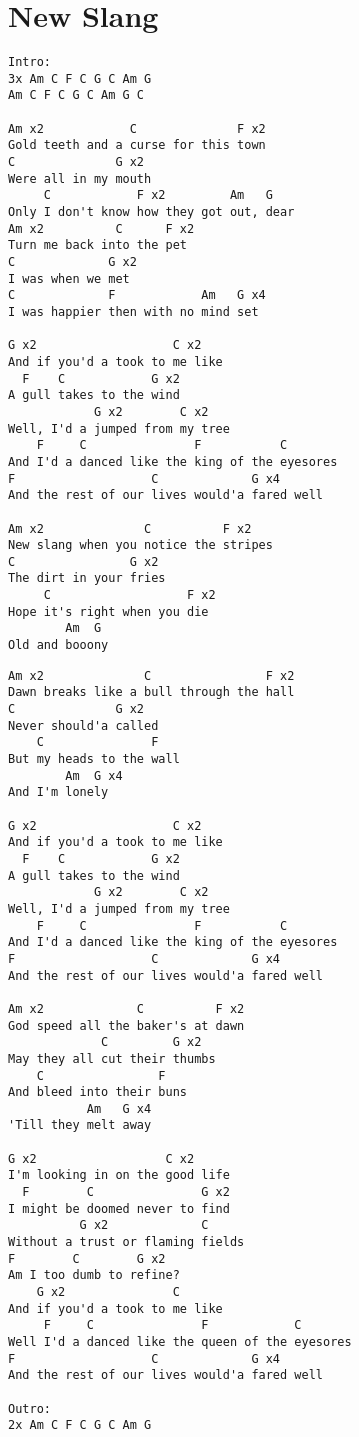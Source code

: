 \documentclass[leqno]{memoir}
\begin{document}
\chapter{New Slang}
\begin{verbatim}
Intro:
3x Am C F C G C Am G
Am C F C G C Am G C

Am x2            C              F x2
Gold teeth and a curse for this town
C              G x2
Were all in my mouth
     C            F x2         Am   G
Only I don't know how they got out, dear
Am x2          C      F x2
Turn me back into the pet
C             G x2
I was when we met
C             F            Am   G x4
I was happier then with no mind set

G x2                   C x2
And if you'd a took to me like
  F    C            G x2
A gull takes to the wind
            G x2        C x2
Well, I'd a jumped from my tree
    F     C               F           C
And I'd a danced like the king of the eyesores
F                   C             G x4
And the rest of our lives would'a fared well

Am x2              C          F x2
New slang when you notice the stripes
C                G x2
The dirt in your fries
     C                   F x2
Hope it's right when you die
        Am  G
Old and booony
\end{verbatim}
\newpage
\begin{verbatim}
Am x2              C                F x2
Dawn breaks like a bull through the hall
C              G x2
Never should'a called
    C               F 
But my heads to the wall
        Am  G x4
And I'm lonely

G x2                   C x2
And if you'd a took to me like
  F    C            G x2
A gull takes to the wind
            G x2        C x2
Well, I'd a jumped from my tree
    F     C               F           C
And I'd a danced like the king of the eyesores
F                   C             G x4
And the rest of our lives would'a fared well

Am x2             C          F x2
God speed all the baker's at dawn
             C         G x2
May they all cut their thumbs
    C                F
And bleed into their buns
           Am   G x4
'Till they melt away

G x2                  C x2
I'm looking in on the good life
  F        C               G x2
I might be doomed never to find
          G x2             C
Without a trust or flaming fields
F        C        G x2
Am I too dumb to refine?
    G x2               C
And if you'd a took to me like
     F     C               F            C
Well I'd a danced like the queen of the eyesores
F                   C             G x4
And the rest of our lives would'a fared well

Outro:
2x Am C F C G C Am G
\end{verbatim}
\newpage
\end{document}
